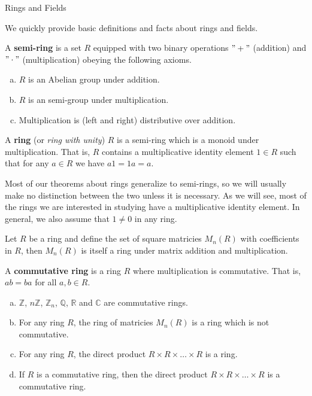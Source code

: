 \begin{section}{Rings and Fields}

We quickly provide basic definitions and facts about rings and fields.

\begin{defn}
A {\bf semi-ring} is a set $R$ equipped with two binary operations $"+"$ (addition) and $"\cdot"$ (multiplication) obeying the following axioms.
\begin{enumerate}[(a)]
\item $R$ is an Abelian group under addition.
\item $R$ is an semi-group under multiplication.
\item Multiplication is (left and right) distributive over addition.
\end{enumerate}
\end{defn}

\begin{defn}
A {\bf ring} (or {\em ring with unity}) $R$ is a semi-ring which is a monoid under multiplication. That is, $R$ contains a multiplicative identity element $1 \in R$ such that for any $a \in R$ we have $a1 = 1a = a$.
\end{defn}

\begin{danger}
Most of our theorems about rings generalize to semi-rings, so we will usually make no distinction between the two unless it is necessary. As we will see, most of the rings we are interested in studying have a multiplicative identity element. In general, we also assume that $1 \neq 0$ in any ring.
\end{danger}

\begin{prop}
Let $R$ be a ring and define the set of square matricies $M_{n}(R)$ with coefficients in $R$, then $M_{n}(R)$ is itself a ring under matrix addition and multiplication.
\end{prop}

\begin{defn}
A {\bf commutative ring} is a ring $R$ where multiplication is commutative. That is, $ab = ba$ for all $a,b \in R$.
\end{defn}

\begin{ex}
\begin{enumerate}[(a)]
\item $\mathbb{Z}$, $n\mathbb{Z}$, $\mathbb{Z}_{n}$, $\mathbb{Q}$, $\mathbb{R}$ and $\mathbb{C}$ are commutative rings.
\item For any ring $R$, the ring of matricies $M_{n}(R)$ is a ring which is not commutative.
\item For any ring $R$, the direct product $R \times R \times \dots \times R$ is a ring.
\item If $R$ is a commutative ring, then the direct product $R \times R \times \dots \times R$ is a commutative ring.
\end{enumerate}
\end{ex}


\end{section}

